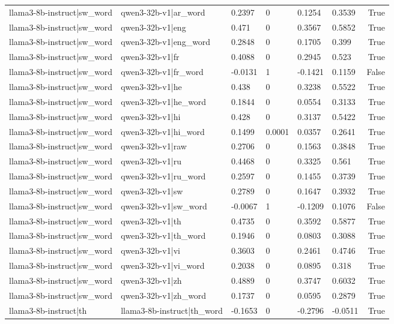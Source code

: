 \begin{table}
\begin{tabular}{llllllr}
llama3-8b-instruct|sw_word & qwen3-32b-v1|ar_word & 0.2397 & 0 & 0.1254 & 0.3539 & True \\
llama3-8b-instruct|sw_word & qwen3-32b-v1|eng & 0.471 & 0 & 0.3567 & 0.5852 & True \\
llama3-8b-instruct|sw_word & qwen3-32b-v1|eng_word & 0.2848 & 0 & 0.1705 & 0.399 & True \\
llama3-8b-instruct|sw_word & qwen3-32b-v1|fr & 0.4088 & 0 & 0.2945 & 0.523 & True \\
llama3-8b-instruct|sw_word & qwen3-32b-v1|fr_word & -0.0131 & 1 & -0.1421 & 0.1159 & False \\
llama3-8b-instruct|sw_word & qwen3-32b-v1|he & 0.438 & 0 & 0.3238 & 0.5522 & True \\
llama3-8b-instruct|sw_word & qwen3-32b-v1|he_word & 0.1844 & 0 & 0.0554 & 0.3133 & True \\
llama3-8b-instruct|sw_word & qwen3-32b-v1|hi & 0.428 & 0 & 0.3137 & 0.5422 & True \\
llama3-8b-instruct|sw_word & qwen3-32b-v1|hi_word & 0.1499 & 0.0001 & 0.0357 & 0.2641 & True \\
llama3-8b-instruct|sw_word & qwen3-32b-v1|raw & 0.2706 & 0 & 0.1563 & 0.3848 & True \\
llama3-8b-instruct|sw_word & qwen3-32b-v1|ru & 0.4468 & 0 & 0.3325 & 0.561 & True \\
llama3-8b-instruct|sw_word & qwen3-32b-v1|ru_word & 0.2597 & 0 & 0.1455 & 0.3739 & True \\
llama3-8b-instruct|sw_word & qwen3-32b-v1|sw & 0.2789 & 0 & 0.1647 & 0.3932 & True \\
llama3-8b-instruct|sw_word & qwen3-32b-v1|sw_word & -0.0067 & 1 & -0.1209 & 0.1076 & False \\
llama3-8b-instruct|sw_word & qwen3-32b-v1|th & 0.4735 & 0 & 0.3592 & 0.5877 & True \\
llama3-8b-instruct|sw_word & qwen3-32b-v1|th_word & 0.1946 & 0 & 0.0803 & 0.3088 & True \\
llama3-8b-instruct|sw_word & qwen3-32b-v1|vi & 0.3603 & 0 & 0.2461 & 0.4746 & True \\
llama3-8b-instruct|sw_word & qwen3-32b-v1|vi_word & 0.2038 & 0 & 0.0895 & 0.318 & True \\
llama3-8b-instruct|sw_word & qwen3-32b-v1|zh & 0.4889 & 0 & 0.3747 & 0.6032 & True \\
llama3-8b-instruct|sw_word & qwen3-32b-v1|zh_word & 0.1737 & 0 & 0.0595 & 0.2879 & True \\
llama3-8b-instruct|th & llama3-8b-instruct|th_word & -0.1653 & 0 & -0.2796 & -0.0511 & True \\

\end{tabular}
\end{table}
